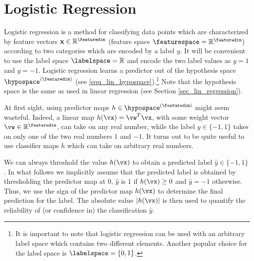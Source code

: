 \documentclass[12pt]{report}
\begin{document}
\begin{center}
\end{center}



\section{Logistic Regression} 
\label{sec_LogReg}

Logistic regression is a method for classifying data points which are characterized by 
feature vectors $\mathbf{x} \in \mathbb{R}^{\featuredim}$ (feature space $\featurespace=\mathbb{R}^{\featuredim}$) 
according to two categories which are encoded by a label $y$. It will be convenient to 
use the label space $\labelspace = \mathbb{R}$ and encode the two label values 
as $y=1$ and $y=-1$. Logistic regression learns a predictor out of the hypothesis space 
$\hypospace^{(\featuredim)}$ (see \eqref{equ_lin_hypospace}).\footnote{It is important to 
	note that logistic regression can be used with an arbitrary label space which contains 
	two different elements. Another popular choice for the label space is $\labelspace=\{0,1\}$.} 
Note that the hypothesis space is the same as used in linear regression (see Section \ref{sec_lin_regression}). 

At first sight, using predictor maps $h \in \hypospace^{(\featuredim)}$ might seem wasteful. 
Indeed, a linear map $h(\vx) = \vw^T \vx$, with some weight vector $\vw \in \mathbb{R}^{\featuredim}$, 
can take on any real number, while the label $y \in \{-1,1\}$ takes on only one of the two 
real numbers $1$ and $-1$. It turns out to be quite useful to use classifier maps 
$h$ which can take on arbitrary real numbers. 

We can always threshold the value $h(\vx)$ to obtain a predicted label $\hat{y} \in \{-1,1\}$. 
In what follows we implicitly assume that the predicted label is obtained by thresholding the 
predictor map at $0$, $\hat{y}$ is $1$ if $h(\vx)\geq 0$ and $\hat{y}=-1$ otherwise. Thus, 
we use the sign of the predictor map $h(\vx)$ to determine the final prediction for the label. 
The absolute value $|h(\vx)|$ is then used to quantify the reliability of (or confidence in) the 
classification $\hat{y}$. 
\end{document}
